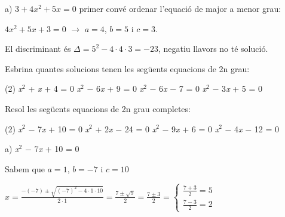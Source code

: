 \begin{example}
	a)	$3 + 4\textit{x}^{2} + 5\textit{x} = 0$ primer convé ordenar l'equació de major a menor grau:
		
		$4x^2+5x+3=0$  \quad  \quad $\rightarrow$  \quad \quad $a=4$, $b=5$ i $c=3$.
		
			
		El discriminant és $\Delta = 5^2 - 4 \cdot 4 \cdot 3 = -23$, negatiu llavors no té solució.	
\end{example}



\pagebreak


\begin{mylist}
	
\exer  Esbrina quantes solucions tenen les següents equacions de 2n grau:
\begin{tasks}(2)
	\task  \textit{x}${}^{2}$ + \textit{x} + 4 = 0    
	\task  \textit{x}${}^{2}$ $-$ 6\textit{x} + 9 = 0   
	\task  \textit{x}${}^{2}$ $-$ 6\textit{x} $-$ 7 = 0  
	\task \textit{ x}${}^{2}$ $-$ 3\textit{x} + 5 = 0
\end{tasks}

\answers{[Cap, $x=3$, $x=-1$ i $x=-7$, Cap]}

\exer  Resol les següents equacions de 2n grau completes:

\begin{tasks}(2)
	\task  \textit{x}${}^{2}$ $-$ 7\textit{x} + 10 = 0   
	\textit{x}${}^{2}$ + 2\textit{x} $-$ 24 = 0   
	\textit{x}${}^{2}$ $-$ 9\textit{x} + 6 = 0  
	\task \textit{ x}${}^{2}$ $-$ 4\textit{x} $-$ 12 = 0
\end{tasks}

\answers{[$x=2$ i $x=5$, $x=-4$ i $x=-3$, $x=1$ i $x=2$, $x=-2$ i $x=6$]}

\end{mylist}

\begin{example}
	a) \textit{x}${}^{2}$ $-$ 7\textit{x} + 10 = 0   
	
	Sabem que $a=1$, $b=-7$ i $c=10$
	
	$x=\frac{-(-7)\pm \sqrt{(-7)^2-4\cdot  1\cdot  10}}{2\cdot 1}=\frac{7\pm \sqrt{9}}{2}=\frac{7\pm 3}{2}=\left\{ \begin{array}{l} \frac{7 + 3}{2}=\boxed{5} \\ [0.25cm] \frac{7- 3}{2}=\boxed{2} \end{array} \right.$
	
\end{example}


